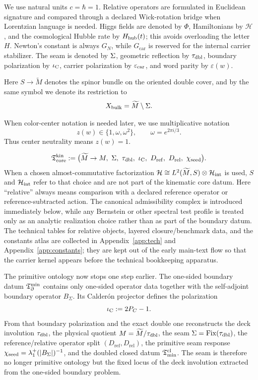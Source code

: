 We use natural units $c=\hbar=1$. Relative operators are formulated in Euclidean signature and compared through a declared Wick-rotation bridge when Lorentzian language is needed. Higgs fields are denoted by $\Phi$, Hamiltonians by $\mathcal H$, and the cosmological Hubble rate by $H_{\mathrm{hub}}(t)$; this avoids overloading the letter $H$. Newton's constant is always $G_N$, while $G_{\mathrm{car}}$ is reserved for the internal carrier stabilizer. The seam is denoted by $\Sigma$, geometric reflection by $\tau_{\mathrm{dbl}}$, boundary polarization by $\iota_{\mathrm C}$, carrier polarization by $\varepsilon_{\mathrm{car}}$, and word parity by $\varepsilon(w)$.

Here $S\to \widetilde M$ denotes the spinor bundle on the oriented double cover, and by the same symbol we denote its restriction to
\[
X_{\mathrm{bulk}}=\widetilde M\setminus\Sigma.
\]

When color-center notation is needed later, we use multiplicative notation
\[
z(w)\in\{1,\omega,\omega^2\},
\qquad
\omega=e^{2\pi i/3}.
\]
Thus center neutrality means $z(w)=1$.

\[
\Tcore^{\mathrm{kin}}
:=
\bigl(
\widetilde M\to M,\ \Seam,\ \taudbl,\ \iC,\ D_{\mathrm{ref}},\ D_{\mathrm{rel}},\ \chiseed
\bigr).
\]
When a chosen almost-commutative factorization
$\mathcal H\cong L^2(\widetilde M,S)\otimes\mathcal H_{\mathrm{int}}$ is used, $S$ and $\mathcal H_{\mathrm{int}}$ refer to that
choice and are not part of the kinematic core datum.
Here \enquote{relative} always means comparison with a declared reference operator or
reference-subtracted action. The canonical admissibility complex is introduced immediately below,
while any Bernstein or other spectral test profile is treated only as an analytic realization
choice rather than as part of the boundary datum. The technical tables for relative objects,
layered closure/benchmark data, and the constants atlas are collected in
Appendix~\ref{app:tech} and Appendix~\ref{app:constants}; they are kept out of the early
main-text flow so that the carrier kernel appears before the technical bookkeeping apparatus.

\begin{remark}
The primitive ontology now stops one step earlier. The one-sided boundary datum $\mathfrak T_{\partial}^{\min}$
contains only one-sided operator data together with the self-adjoint boundary operator
$B_\Sigma$. Its Calder\'on projector defines the polarization
\[
\iota_{\mathrm C}:=2P_C-1.
\]
From that boundary polarization and the exact double one reconstructs the deck involution
$\tau_{\mathrm{dbl}}$, the physical quotient $M=\widetilde M/\tau_{\mathrm{dbl}}$, the seam
$\Sigma=\mathrm{Fix}(\tau_{\mathrm{dbl}})$, the reference/relative operator split
$(D_{\mathrm{ref}},D_{\mathrm{rel}})$, the primitive seam response
$\chi_{\mathrm{seed}}=\lambda_1^+(|B_\Sigma|)^{-1}$, and the doubled closed datum
$\mathfrak T_{\mathrm{min}}^{\mathrm{cl}}$. The seam is therefore no longer primitive ontology but the fixed locus of
the deck involution extracted from the one-sided boundary problem.
\end{remark}

